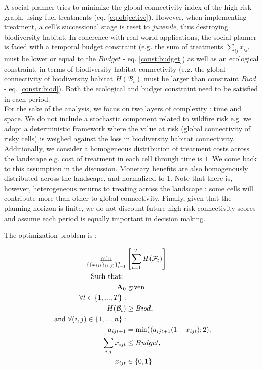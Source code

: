 A social planner tries to minimize the global connectivity index of the high risk graph, using fuel treatments (eq. \ref{eq:objective}). However, when implementing treatment, a cell's successional stage is reset to \textit{juvenile}, thus destroying biodiversity habitat. In coherence with real world applications, the social planner is faced with a temporal budget constraint (e.g. the sum of treatments $\sum_{ij}x_{ijt}$ must be lower or equal to the $Budget$ - eq. \ref{const:budget}) as well as an ecological constraint, in terms of biodiversity habitat connectivity (e.g. the global connectivity of biodiversity habitat $H(\mathcal{B}_t)$ must be larger than constraint $Biod$ - eq. \ref{constr:biod}). Both the ecological and budget constraint need to be satisfied in each period.
\\
For the sake of the analysis, we focus on two layers of complexity : time and space. We do not include a stochastic component related to wildfire risk e.g. we adopt a deterministic framework where the value at risk (global connectivity of risky cells) is weighed against the loss in biodiversity habitat connectivity. Additionally, we consider a homogeneous distribution of treatment costs across the landscape e.g. cost of treatment in each cell through time is $1$. We come back to this assumption in the discussion. Monetary benefits are also homogenously distributed across the landscape, and normalized to 1. Note that there is, however, heterogeneous returns to treating across the landscape : some cells will contribute more than other to global connectivity. Finally, given that the planning horizon is finite, we do not discount future high risk connectivity scores and assume each period is equally important in decision making.

The optimization problem is : 

\begin{align}
    \min_{ \{\{x_{ijt}\}_{(i,j)}\}_{t=1}^T} & \left[ \sum_{t=1}^T H(\mathcal{F}_t)\right] \label{eq:objective}\\
\text{Such that: } & \notag \\
\mathbf{A}_0 &\text{ given} \label{eq:init_cond}\\
\forall t \in \{1, ..., T\} : & \notag \\
H(\mathcal{B}_t)&\geq Biod,\text{  }\label{constr:biod}\\
\text{ and }\forall (i,j) \in \{1,...,n\}   :& \notag \\
a_{ijt+1}& = \min((a_{ijt+1}(1-x_{ijt});2), \label{const:dyn}\\
 \sum_{i,j} x_{ijt} & \leq Budget,\text{  } \label{const:budget}\\
x_{ijt}&\in \{0,1\}\label{const:control}
\end{align}

